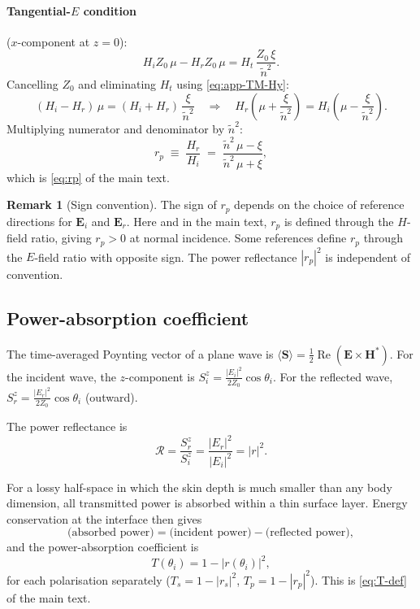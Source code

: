 \documentclass[11pt,a4paper]{article}
\theoremstyle{definition}      %
\newtheorem{remark}[remark]{Remark}
\newcommand{\EE}{\mathbf{E}}
\newcommand{\HH}{\mathbf{H}}
\newcommand{\ntilde}{\tilde{n}}
\DeclareMathOperator{\RE}{Re}
\begin{document}
\paragraph{Tangential-$E$ condition} ($x$-component at $z=0$):
\begin{equation}\label{eq:app-TM-Ex}
  H_i Z_0\,\mu - H_r Z_0\,\mu
  = H_t\,\frac{Z_0\,\xi}{\ntilde^2}.
\end{equation}
Cancelling $Z_0$ and eliminating $H_t$ using \cref{eq:app-TM-Hy}:
\begin{equation}
  (H_i - H_r)\,\mu = (H_i + H_r)\,\frac{\xi}{\ntilde^2}
  \quad\Longrightarrow\quad
  H_r\!\left(\mu + \frac{\xi}{\ntilde^2}\right)
  = H_i\!\left(\mu - \frac{\xi}{\ntilde^2}\right).
\end{equation}
Multiplying numerator and denominator by $\ntilde^2$:
\begin{equation}\label{eq:app-rp-result}
  \boxed{r_p \;\equiv\; \frac{H_r}{H_i}
    \;=\; \frac{\ntilde^2\,\mu - \xi}{\ntilde^2\,\mu + \xi},}
\end{equation}
which is \cref{eq:rp} of the main text.

\begin{remark}[Sign convention]
The sign of $r_p$ depends on the choice of reference directions for
$\EE_i$ and $\EE_r$.  Here and in the main text, $r_p$ is defined
through the $H$-field ratio, giving $r_p>0$ at normal incidence.  Some references define
$r_p$ through the $E$-field ratio with opposite sign.  The power
reflectance $|r_p|^2$ is independent of convention.
\end{remark}

\subsection{Power-absorption coefficient}
\label{app:power-T}

The time-averaged Poynting vector of a plane wave is
$\langle\mathbf{S}\rangle=\frac{1}{2}\RE(\EE\times\HH^*)$.  For the
incident wave, the $z$-component is
$S_i^z = \frac{|E_i|^2}{2Z_0}\cos\theta_i$.  For the reflected wave,
$S_r^z = \frac{|E_r|^2}{2Z_0}\cos\theta_i$ (outward).

The power reflectance is
\begin{equation}
  \mathcal{R} = \frac{S_r^z}{S_i^z}
  = \frac{|E_r|^2}{|E_i|^2} = |r|^2.
\end{equation}

For a lossy half-space in which the skin depth is much smaller than
any body dimension, all transmitted power is absorbed within a thin
surface layer.  Energy conservation at the interface then gives
\begin{equation}
  \text{(absorbed power)} = \text{(incident power)}
  - \text{(reflected power)},
\end{equation}
and the power-absorption coefficient is
\begin{equation}\label{eq:app-T-result}
  \boxed{T(\theta_i) = 1 - |r(\theta_i)|^2,}
\end{equation}
for each polarisation separately ($T_s=1-|r_s|^2$,
$T_p=1-|r_p|^2$).  This is \cref{eq:T-def} of the main text.
\end{document}
